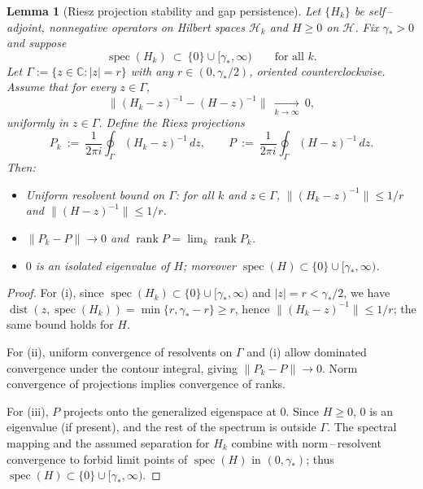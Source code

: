 \documentclass[11pt]{amsart}
\theoremstyle{plain}
\newtheorem{lemma}[theorem]{Lemma}
\theoremstyle{definition}
\theoremstyle{remark}
\begin{document}
\begin{lemma}[Riesz projection stability and gap persistence]\label{lem:riesz-gap}
Let $\{H_k\}$ be self\,–\,adjoint, nonnegative operators on Hilbert spaces $\mathcal H_k$ and $H\ge 0$ on $\mathcal H$. Fix $\gamma_*>0$ and suppose
\[
  \operatorname{spec}(H_k)\ \subset\ \{0\}\cup[\gamma_*,\infty)\qquad \text{for all $k$}.
\]
Let $\Gamma:=\{ z\in\mathbb C: |z|=r\}$ with any $r\in(0,\gamma_*/2)$, oriented counterclockwise. Assume that for every $z\in\Gamma$,
\[
  \|(H_k-z)^{-1}-(H-z)^{-1}\|\ \xrightarrow[k\to\infty]{}\ 0,
\]
uniformly in $z\in\Gamma$. Define the Riesz projections
\[
  P_k\ :=\ \frac{1}{2\pi i}\oint_\Gamma (H_k-z)^{-1}\,dz,\qquad
  P\ :=\ \frac{1}{2\pi i}\oint_\Gamma (H-z)^{-1}\,dz.
\]
Then:
\begin{itemize}
  \item[(i)] Uniform resolvent bound on $\Gamma$: for all $k$ and $z\in\Gamma$, $\|(H_k-z)^{-1}\|\le 1/r$ and $\|(H-z)^{-1}\|\le 1/r$.
  \item[(ii)] $\|P_k-P\|\to 0$ and $\operatorname{rank}P=\lim_k\operatorname{rank}P_k$.
  \item[(iii)] $0$ is an isolated eigenvalue of $H$; moreover $\operatorname{spec}(H)\subset\{0\}\cup[\gamma_*,\infty)$.
\end{itemize}
\end{lemma}
\begin{proof}
For (i), since $\operatorname{spec}(H_k)\subset\{0\}\cup[\gamma_*,\infty)$ and $|z|=r<\gamma_*/2$, we have $\operatorname{dist}(z,\operatorname{spec}(H_k))=\min\{r,\gamma_*-r\}\ge r$, hence $\|(H_k-z)^{-1}\|\le 1/r$; the same bound holds for $H$.

For (ii), uniform convergence of resolvents on $\Gamma$ and (i) allow dominated convergence under the contour integral, giving $\|P_k-P\|\to 0$. Norm convergence of projections implies convergence of ranks.

For (iii), $P$ projects onto the generalized eigenspace at $0$. Since $H\ge 0$, $0$ is an eigenvalue (if present), and the rest of the spectrum is outside $\Gamma$. The spectral mapping and the assumed separation for $H_k$ combine with norm\,–\,resolvent convergence to forbid limit points of $\operatorname{spec}(H)$ in $(0,\gamma_*)$; thus $\operatorname{spec}(H)\subset\{0\}\cup[\gamma_*,\infty)$.
\end{proof}
\end{document}
